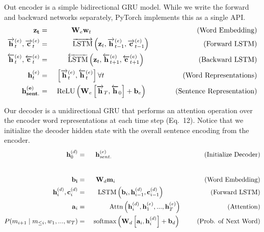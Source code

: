 \documentclass[a4paper,10pt]{article}
\begin{document}
 Out encoder is a simple bidirectional GRU model. While we write the forward and backward networks separately, PyTorch implements this as a single API.
\begin{eqnarray}
\mathbf{z_t} &=& \mathbf{W}_e\mathbf{w}_{t} \mbox{\hspace{148pt}(Word Embedding)}\\
\overrightarrow{\mathbf{h}}_t^{(e)}, \overrightarrow{\mathbf{c}}_t^{(e)} &=& \overrightarrow{\mbox{LSTM}}\left(\textbf{z}_t, \overrightarrow{\mathbf{h}}_{t-1}^{(e)}, \overrightarrow{\mathbf{c}}_{t-1}^{(e)}\right) \mbox{\hspace{75pt}(Forward LSTM)}\\
\overleftarrow{\mathbf{h}}_t^{(e)}, \overleftarrow{\mathbf{c}}_t^{(e)} &=& \overleftarrow{\mbox{LSTM}}\left(\textbf{z}_t, \overleftarrow{\mathbf{h}}_{t+1}^{(e)}, \overleftarrow{\mathbf{c}}_{t+1}^{(e)}\right) \mbox{\hspace{75pt}(Backward LSTM)}\\
\mathbf{h}_t^{(e)} &=& \left[\overrightarrow{\mathbf{h}}_t^{(e)}, \overleftarrow{\mathbf{h}}_t^{(e)}\right] \forall t\mbox{\hspace{110pt}(Word Representations)}\\ \mathbf{h^{(e)}_{sent.}} &=& \mbox{ ReLU}\left(\mathbf{W}_e\left[\overrightarrow{\mathbf{h}}_T, \overleftarrow{\mathbf{h}}_0\right] + \mathbf{b}_e\right) \mbox{\hspace{40pt}(Sentence Representation)}
\end{eqnarray}

\newpage
{} Our decoder is a unidirectional GRU that performs an attention operation over the encoder word representations at each time step (Eq.~12). Notice that we initialize the decoder hidden state with the overall sentence encoding from the encoder.
\begin{eqnarray}
\mathbf{h}_0^{(d)} &=& \mathbf{h}_{sent.}^{(e)}\mbox{\hspace{140pt}(Initialize Decoder)}\\
 \nonumber\\[8pt]
\mathbf{b_i} &=& \mathbf{W}_d\mathbf{m}_{i} \mbox{\hspace{135pt}(Word Embedding)}\\
{\mathbf{h}}_i^{(d)}, {\mathbf{c}}_i^{(d)} &=& {\mbox{LSTM}}\left(\textbf{b}_i, {\mathbf{h}}_{i-1}^{(d)}, {\mathbf{c}}_{i-1}^{(d)}\right) \mbox{\hspace{70pt}(Forward LSTM)}\\
\mathbf{a}_i &=& \mbox{Attn}\left(\mathbf{h}_i^{(d)}, \mathbf{h}_1^{(e)}, ... , \mathbf{h}_T^{(e)}\right) \mbox{\hspace{70pt}(Attention)}\\ 
P(m_{i+1} \mid m_{\leq i}, w_1, ... , w_T) &=& \mbox{ softmax}\left(\mathbf{W}_d\left[\mathbf{a}_i, \mathbf{h}_i^{(d)}\right] + \mathbf{b}_d\right) \mbox{\hspace{25pt}(Prob. of Next Word)}
\end{eqnarray}
\end{document}
